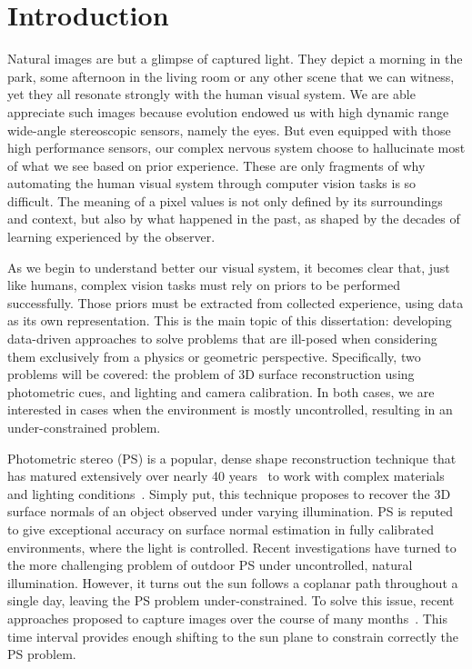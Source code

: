 \chapter*{Introduction}         %

Natural images are but a glimpse of captured light. They depict a morning in the park, some afternoon in the living room or any other scene that we can witness, yet they all resonate strongly with the human visual system. We are able appreciate such images because evolution endowed us with high dynamic range wide-angle stereoscopic sensors, namely the eyes. But even equipped with those high performance sensors, our complex nervous system choose to hallucinate most of what we see based on prior experience. These are only fragments of why automating the human visual system through computer vision tasks is so difficult. The meaning of a pixel values is not only defined by its surroundings and context, but also by what happened in the past, as shaped by the decades of learning experienced by the observer.

As we begin to understand better our visual system, it becomes clear that, just like humans, complex vision tasks must rely on priors to be performed successfully. Those priors must be extracted from collected experience, using data as its own representation. This is the main topic of this dissertation: developing data-driven approaches to solve problems that are ill-posed when considering them exclusively from a physics or geometric perspective. Specifically, two problems will be covered: the problem of 3D surface reconstruction using photometric cues, and lighting and camera calibration. In both cases, we are interested in cases when the environment is mostly uncontrolled, resulting in an under-constrained problem.


Photometric stereo (PS) is a popular, dense shape reconstruction technique that has matured extensively over nearly 40 years~\cite{woodham-opteng-80} to work with complex materials and lighting conditions~\cite{alldrin-cvpr-08,basri-ijcv-07,johnson-cvpr-11,oxholm-eccv-12}.
Simply put, this technique proposes to recover the 3D surface normals of an object observed under varying illumination.
PS is reputed to give exceptional accuracy on surface normal estimation in fully calibrated environments, where the light is controlled.
Recent investigations have turned to the more challenging problem of outdoor PS under uncontrolled, natural illumination. However, it turns out the sun follows a coplanar path throughout a single day, leaving the PS problem under-constrained. To solve this issue, recent approaches proposed to capture images over the course of many months~\cite{ackermann-cvpr-12,abrams-eccv-12}. This time interval provides enough shifting to the sun plane to constrain correctly the PS problem.

